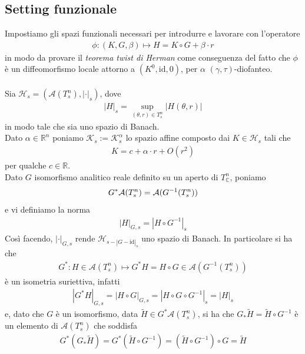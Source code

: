 \documentclass[twoside, 11pt]{amsbook}
\newcommand{\0}{{(0)}}
\newcommand{\3}{{(3)}}
\theoremstyle{colonplain}
\theoremstyle{colondefinition}
\theoremstyle{colonremark}
\numberwithin{equation}{chapter}
\begin{document}
\subsection{Setting funzionale}
Impostiamo gli spazi funzionali necessari per introdurre e lavorare con l'operatore
\begin{align}
    \phi : (K, G, \beta) \mapsto H = K \circ G + \beta \cdot r 
\end{align}
in modo da provare il \textit{teorema twist di Herman} come conseguenza del fatto che $\phi$ è un diffeomorfismo locale attorno a $(K^0, \mathrm{id}, 0)$, per $\alpha$ $(\gamma, \tau)$-diofanteo. \\ \\
Sia $\mathcal{H}_s = (\mathcal{A}(T^n_s), |\cdot|_s)$, dove
\begin{align}
    |H|_s = \sup_{(\theta, r) \in T^n_s} |H(\theta, r)| 
\end{align}
in modo tale che sia uno spazio di Banach. \\
Dato $\alpha \in \mathbb{R}^n$ poniamo $\mathcal{K}_s := \mathcal{K}^\alpha_s$ lo spazio affine composto dai $K \in \mathcal{H}_s$ tali che
\begin{align}
    K = c + \alpha \cdot r + O(r^2) 
\end{align}
per qualche $c \in \mathbb{R}$. \\
Dato $G$ isomorfismo analitico reale definito su un aperto di $T^n_{\mathbb{C}}$, poniamo
\begin{align}
    G^*\mathcal{A}(T^n_s) = \mathcal{A}(G^{-1}(T^n_s)) \notag
\end{align}
e vi definiamo la norma
\begin{align}
    |H|_{G, s} = |H \circ G^{-1}|_s 
\end{align}
Così facendo, $|\cdot|_{G, s}$ rende $\mathcal{H}_{s - |G - \mathrm{id}|_s}$ uno spazio di Banach. In particolare si ha che
\begin{align}
    G^* : H \in \mathcal{A}(T^n_s) \mapsto G^*H = H \circ G \in \mathcal{A}(G^{-1}(T^n_s)) 
\end{align}
è un isometria suriettiva, infatti
\begin{align}
    |G^*H|_{G, s} = |H \circ G|_{G, s} = |H \circ G \circ G^{-1}|_s = |H|_s
\end{align}
e, dato che $G$ è un isomorfismo, data $\widetilde{H} \in G^*\mathcal{A}(T^n_s)$, si ha che $G_*\widetilde{H} = \widetilde{H} \circ G^{-1}$ è un elemento di $\mathcal{A}(T^n_s)$ che soddisfa
\begin{align}
    G^*(G_*\widetilde{H}) = G^*(\widetilde{H} \circ G^{-1}) = (\widetilde{H} \circ G^{-1}) \circ G = \widetilde{H}
\end{align}
\end{document}
